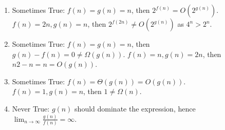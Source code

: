 \vspace{.5em}
\begin{Answer}
    \begin{enumerate}
        \item Sometimes True: $f(n)=g(n)=n$, then $2^{f(n)} = O(2^{g(n)})$. $f(n)=2n, g(n)=n$, then $2^{f(2n)} \neq O(2^{g(n)})$ as $4^n > 2^n$.
        \item Sometimes True: $f(n)=g(n)=n$, then $g(n) - f(n) = 0 \neq \Omega(g(n))$. $f(n)=n, g(n)=2n$, then $n2 - n = n = O(g(n))$.
        \item Sometimes True: $f(n)=\Theta(g(n))=O(g(n))$. $f(n) = 1, g(n) = n$, then $1 \neq \Omega(n)$.
        \item Never True: $g(n)$ should dominate the expression, hence $\lim_{n \to \infty} \frac{g(n)}{f(n)} = \infty$.
    \end{enumerate}
\end{Answer}
    




